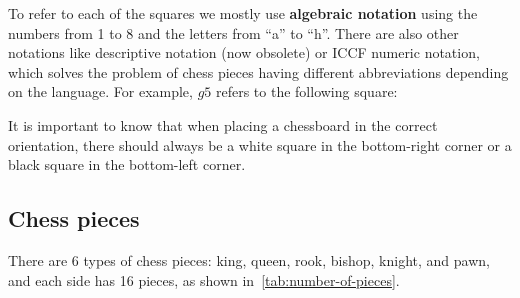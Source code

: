 \vspace{1em}

\noindent To refer to each of the squares we mostly use \textbf{algebraic notation} using the numbers from 1 to 8 and the letters from ``a'' to ``h''. There are also other notations like descriptive notation (now obsolete) or ICCF numeric notation, which solves the problem of chess pieces having different abbreviations depending on the language. For example, $g5$ refers to the following square:

\begin{center}
    \newchessgame %
    \chessboard[
        setpieces={}, %
        showmover=false,
        markstyle=circle, color=red, markfield=g5, %
        pgfstyle=straightmove, color=blue, %
        markmoves={g1-g5, a5-g5}, %
        arrow=to %
    ]
\end{center}

\noindent It is important to know that when placing a chessboard in the correct orientation, there should always be a white square in the bottom-right corner or a black square in the bottom-left corner.

\subsection*{Chess pieces}

There are 6 types of chess pieces: king, queen, rook, bishop, knight, and pawn, and each side has 16 pieces, as shown in~\cref{tab:number-of-pieces}.

\vspace{1em}

